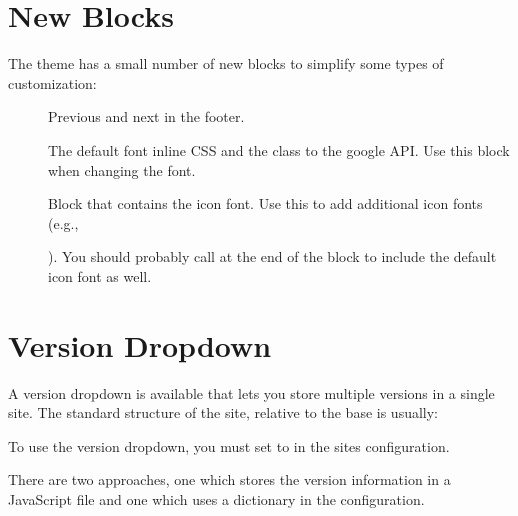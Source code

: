 \documentclass[letterpaper,10pt,english]{sphinxmanual}
\begin{document}
\section{New Blocks}
\label{\detokenize{customization:new-blocks}}
The theme has a small number of new blocks to simplify some types of
customization:
\begin{description}
\item[{}] \leavevmode
Previous and next in the footer.

\item[{}] \leavevmode
The default font inline CSS and the class to the google API. Use this
block when changing the font.

\item[{}] \leavevmode
Block that contains the icon font. Use this to add additional icon fonts
(e.g., %
\begin{footnote}[6]\sphinxAtStartFootnote
{}
%
\end{footnote}). You should probably call  at
the end of the block to include the default icon font as well.

\end{description}


\section{Version Dropdown}
\label{\detokenize{customization:version-dropdown}}
A version dropdown is available that lets you store multiple versions in a single site.
The standard structure of the site, relative to the base is usually:

\begin{sphinxVerbatim}[commandchars=\\\{\}]
\end{sphinxVerbatim}

To use the version dropdown, you must set  to  in
the sites configuration.

There are two approaches, one which stores the version information in a JavaScript file
and one which uses a dictionary in the configuration.
\end{document}
